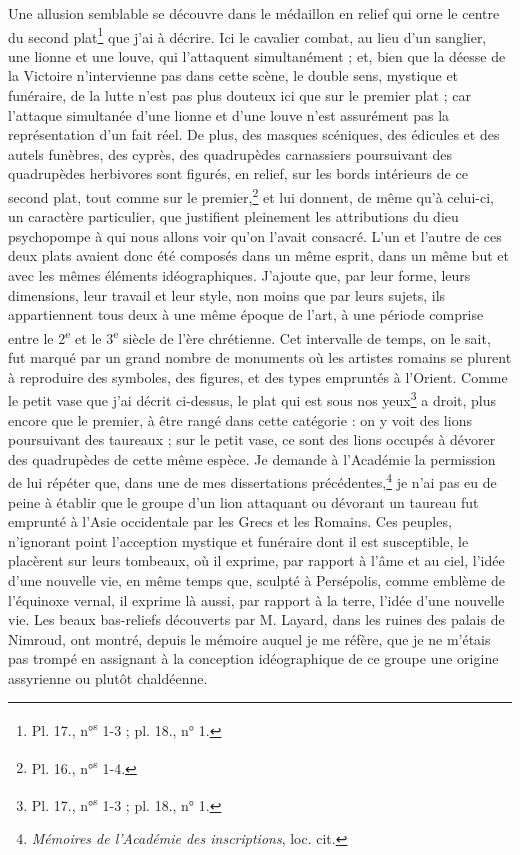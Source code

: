 \documentclass{article}
\begin{document}
Une allusion semblable se découvre dans le médaillon en relief qui orne le centre du second plat\footnote{Pl. 17., n°\textsuperscript{s} 1-3 ; pl. 18., n° 1.} que j'ai à décrire. Ici le cavalier combat, au lieu d'un sanglier, une lionne et une louve, qui l'attaquent simultanément ; et, bien que la déesse de la Victoire n'intervienne pas dans cette scène, le double sens, mystique et funéraire, de la lutte n'est pas plus douteux ici que sur le premier plat ; car l'attaque simultanée d'une lionne et d'une louve n'est assurément pas la représentation d'un fait réel. De plus, des masques scéniques, des édicules et des autels funèbres, des cyprès, des quadrupèdes carnassiers poursuivant des quadrupèdes herbivores sont figurés, en relief, sur les bords intérieurs de ce second plat, tout comme sur le premier,\footnote{Pl. 16., n°\textsuperscript{s} 1-4.} et lui donnent, de même qu'à celui-ci, un caractère particulier, que justifient pleinement les attributions du dieu psychopompe à qui nous allons voir qu'on l'avait consacré. L'un et l'autre de ces deux plats avaient donc été composés dans un même esprit, dans un même but et avec les mêmes éléments idéographiques. J'ajoute que, par leur forme, leurs dimensions, leur travail et leur style, non moins que par leurs sujets, ils appartiennent tous deux à une même époque de l'art, à une période comprise entre le 2\textsuperscript{e} et le 3\textsuperscript{e} siècle de l'ère chrétienne. Cet intervalle de temps, on le sait, fut marqué par un grand nombre de monuments où les artistes romains se plurent à reproduire des symboles, des figures, et des types empruntés à l'Orient. Comme le petit vase que j'ai décrit ci-dessus, le plat qui est sous nos yeux\footnote{Pl. 17., n°\textsuperscript{s} 1-3 ; pl. 18., n° 1.} a droit, plus encore que le premier, à être rangé dans cette catégorie : on y voit des lions poursuivant des taureaux ; sur le petit vase, ce sont des lions occupés à dévorer des quadrupèdes de cette même espèce. Je demande à l'Académie la permission de lui répéter que, dans une de mes dissertations précédentes,\footnote{\emph{Mémoires de l'Académie des inscriptions}, loc. cit.} je n'ai pas eu de peine à établir que le groupe d'un lion attaquant ou dévorant un taureau fut emprunté à l'Asie occidentale par les Grecs et les Romains. Ces peuples, n'ignorant point l'acception mystique et funéraire dont il est susceptible, le placèrent sur leurs tombeaux, où il exprime, par rapport à l'âme et au ciel, l'idée d'une nouvelle vie, en même temps que, sculpté à Persépolis, comme emblème de l'équinoxe vernal, il exprime là aussi, par rapport à la terre, l'idée d'une nouvelle vie. Les beaux bas-reliefs découverts par M. Layard, dans les ruines des palais de Nimroud, ont montré, depuis le mémoire auquel je me réfère, que je ne m'étais pas trompé en assignant à la conception idéographique de ce groupe une origine assyrienne ou plutôt chaldéenne.
\end{document}
